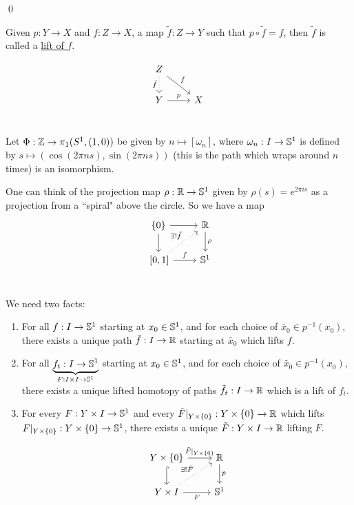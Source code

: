 \documentclass[x11names,reqno,14pt]{extarticle}
\begin{document}
\qed


Given $p:Y\to X$ and $f:Z\to X$, a map $\tilde{f}:Z\to Y$ such that $p\circ\tilde{f} = f$, then $\tilde{f}$ is called a \underline{lift of $f$}.

\[
\begin{tikzcd}
Z\ar[dr, "f"]\ar[d, dotted, "\tilde{f}"'] & \\
Y \ar[r, "p"] & X \\
\end{tikzcd}
\]


\thm

Let $\Phi:\mathbb{Z}\to\pi_1(S^1, (1, 0))$ be given by $n\mapsto[\omega_n]$, where $\omega_n:I\to \mathbb{S}^1$ is defined by $s\mapsto(\cos(2\pi ns), \sin(2\pi n s))$ (this is the path which wraps around $n$ times) is an isomorphism. 

\proof

One can think of the projection map $\rho:\mathbb{R}\to\mathbb{S}^1$ given by $\rho(s) = e^{2\pi i s}$ as a projection from a ``spiral" above the circle. So we have a map 
\[
\begin{tikzcd}
\{0\} \ar[r]\ar[d] & \R \ar[d, "\rho"] \\
\,[0, 1]\ar[r, "f"]\ar[ur, dotted, "\exists! \tilde{f}"] & \mbb{S}^1 \\
\end{tikzcd}
\]

We need two facts: 

\begin{enumerate}[label=(\alph*)]

\item For all $f:I\to\mathbb{S}^1$ starting at $x_0 \in \mathbb{S}^1$, and for each choice of $\tilde{x_0} \in p^{-1}(x_0)$, there exists a unique path $\tilde{f}:I\to\mathbb{R}$ starting at $\tilde{x_0}$ which lifts $f$. 

\item For all $\underbrace{f_t:I\to\mathbb{S}^1}_{F:I\times I\to\mathbb{S}^1}$ starting at $x_0 \in \mathbb{S}^1$, and for each choice of $\tilde{x_0} \in p^{-1}(x_0)$, there exists a unique lifted homotopy of paths $\tilde{f_t}:I\to \mathbb{R}$ which is a lift of $f_t$. 

\item For every $F:Y\times I\to \mathbb{S}^1$ and every $\tilde{F}|_{Y\times\{0\}}:Y\times\{0\}\to\mathbb{R}$ which lifts $F|_{Y\times\{0\}}:Y\times\{0\}\to\mathbb{S}^1$, there exists a unique $\tilde{F}:Y\times I\to\mathbb{R}$ lifting $F$. 

\[
\begin{tikzcd}
Y\times\{0\}\ar[d, hook]\ar[r, "\tilde{F}|_{Y\times\{0\}}"] & \R \ar[d, "p"] \\
Y\times I \ar[ur, dotted, "\exists!\tilde{F}"]\ar[r, "F"'] & \mbb{S}^1 \\
\end{tikzcd}
\]
\end{enumerate}
\end{document}
